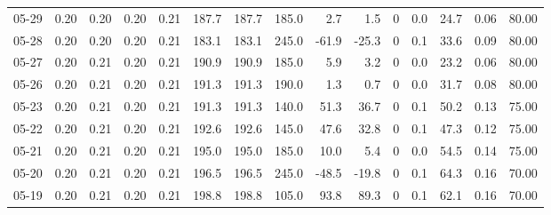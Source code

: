 \begin{threeparttable}
{\begin{tabular}{lrrrrrrrrrrrrrr}
  05-29 &          0.20 &          0.20 &          0.20 &        0.21 &               187.7 &              187.7 &               185.0 &        2.7 &          1.5 &              0 &                 0.0 &             24.7 &            0.06 &                  80.00 \\
  05-28 &          0.20 &          0.20 &          0.20 &        0.21 &               183.1 &              183.1 &               245.0 &      -61.9 &        -25.3 &              0 &                 0.1 &             33.6 &            0.09 &                  80.00 \\
  05-27 &          0.20 &          0.21 &          0.20 &        0.21 &               190.9 &              190.9 &               185.0 &        5.9 &          3.2 &              0 &                 0.0 &             23.2 &            0.06 &                  80.00 \\
  05-26 &          0.20 &          0.21 &          0.20 &        0.21 &               191.3 &              191.3 &               190.0 &        1.3 &          0.7 &              0 &                 0.0 &             31.7 &            0.08 &                  80.00 \\
  05-23 &          0.20 &          0.21 &          0.20 &        0.21 &               191.3 &              191.3 &               140.0 &       51.3 &         36.7 &              0 &                 0.1 &             50.2 &            0.13 &                  75.00 \\
  05-22 &          0.20 &          0.21 &          0.20 &        0.21 &               192.6 &              192.6 &               145.0 &       47.6 &         32.8 &              0 &                 0.1 &             47.3 &            0.12 &                  75.00 \\
  05-21 &          0.20 &          0.21 &          0.20 &        0.21 &               195.0 &              195.0 &               185.0 &       10.0 &          5.4 &              0 &                 0.0 &             54.5 &            0.14 &                  75.00 \\
  05-20 &          0.20 &          0.21 &          0.20 &        0.21 &               196.5 &              196.5 &               245.0 &      -48.5 &        -19.8 &              0 &                 0.1 &             64.3 &            0.16 &                  70.00 \\
  05-19 &          0.20 &          0.21 &          0.20 &        0.21 &               198.8 &              198.8 &               105.0 &       93.8 &         89.3 &              0 &                 0.1 &             62.1 &            0.16 &                  70.00 \\

\end{tabular}}
\end{threeparttable}
